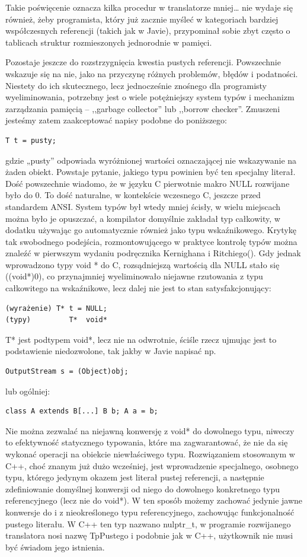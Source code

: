 Takie poświęcenie oznacza kilka procedur w translatorze mniej… nie wydaje się również, żeby programista, który już zacznie myśleć w kategoriach bardziej współczesnych referencji (takich jak w Javie), przypominał sobie zbyt często o tablicach struktur rozmieszonych jednorodnie w pamięci.

Pozostaje jeszcze do rozstrzygnięcia kwestia pustych referencji. Powszechnie wskazuje się na nie, jako na przyczynę różnych problemów, błędów i podatności. Niestety do ich skutecznego, lecz jednocześnie znośnego dla programisty wyeliminowania, potrzebny jest o wiele potężniejszy system typów i mechanizm zarządzania pamięcią – ,,garbage collector'' lub ,,borrow checker''. Zmuszeni jesteśmy zatem zaakceptować napisy podobne do poniższego:
\begin{lstlisting}
T t = pusty;    
\end{lstlisting}
 gdzie „pusty” odpowiada wyróżnionej wartości oznaczającej nie wskazywanie na żaden obiekt. Powstaje  pytanie, jakiego typu powinien być ten specjalny literał. Dość powszechnie wiadomo, że w języku C pierwotnie makro NULL rozwijane było do 0.\cite[str.~214]{KiR} To dość naturalne, w kontekście wczesnego C, jeszcze przed standardem ANSI. System typów był wtedy mniej ścisły, w wielu miejscach można było je opuszczać, a kompilator domyślnie zakładał typ całkowity, w dodatku używając go automatycznie również jako typu wskaźnikowego. Krytykę tak swobodnego podejścia, rozmontowującego w praktyce kontrolę typów można znaleźć w pierwszym wydaniu podręcznika Kernighana i Ritchiego(\cite{KiR}). Gdy jednak wprowadzono  typy void * do C, rozsądniejszą wartością dla NULL stało się ((void*)0), co przynajmniej wyeliminowało niejawne rzutowania z typu całkowitego na wskaźnikowe, lecz dalej nie jest to stan satysfakcjonujący:
\begin{lstlisting}
(wyrażenie) T* t = NULL;
(typy)         T*  void*
\end{lstlisting}
T* jest podtypem void*, lecz nie na odwrotnie, ściśle rzecz ujmując jest to podstawienie niedozwolone, tak jakby w Javie napisać np.
\begin{lstlisting}
OutputStream s = (Object)obj;
\end{lstlisting}
lub ogólniej:
\begin{lstlisting}
class A extends B[...] B b; A a = b;
\end{lstlisting}
Nie można zezwalać na niejawną konwersję z void* do dowolnego typu, niweczy to efektywność statycznego typowania, które ma zagwarantować, że nie da się wykonać operacji na obiekcie niewłaściwego typu. Rozwiązaniem stosowanym w C++, choć znanym już dużo wcześniej\cite[str.256 - zob. nil\_typ]{waite_goos}, jest wprowadzenie specjalnego, osobnego typu, którego jedynym okazem jest literał pustej referencji, a następnie zdefiniowanie domyślnej konwersji od niego do dowolnego konkretnego typu referencyjnego (lecz nie do void*). W ten sposób możemy zachować jedynie jawne konwersje do i z nieokreślonego typu referencyjnego,  zachowując funkcjonalność pustego literału. W C++ ten typ nazwano nulptr\_t, w programie rozwijanego translatora nosi nazwę TpPustego i podobnie jak w C++, użytkownik nie musi być świadom jego istnienia.
